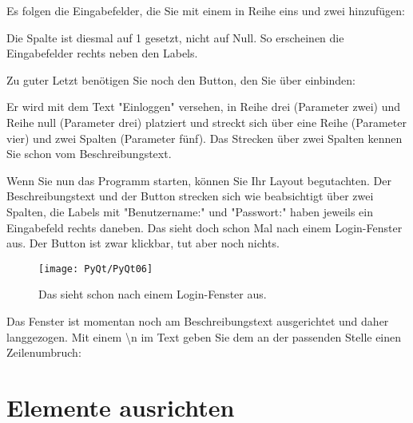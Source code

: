 Es folgen die Eingabefelder, die Sie mit einem  in Reihe eins und zwei hinzufügen:
    
\medskip



\medskip

Die Spalte ist diesmal auf 1 gesetzt, nicht auf Null. So erscheinen die Eingabefelder rechts neben den Labels.
    
Zu guter Letzt benötigen Sie noch den Button, den Sie über  einbinden:
    
\medskip


\medskip


Er wird mit dem Text "Einloggen"{} versehen, in Reihe drei (Parameter zwei) und Reihe null (Parameter drei) platziert und streckt sich über eine Reihe (Parameter vier) und zwei Spalten (Parameter fünf). Das Strecken über zwei Spalten kennen Sie schon vom Beschreibungstext.
    
Wenn Sie nun das Programm starten, können Sie Ihr Layout begutachten. Der Beschreibungstext und der Button strecken sich wie beabsichtigt über zwei Spalten, die Labels mit "Benutzername:"{} und "Passwort:"{} haben jeweils ein Eingabefeld rechts daneben. Das sieht doch schon Mal nach einem Login-Fenster aus. Der Button ist zwar klickbar, tut aber noch nichts.
    
 
\begin{figure}
  \texttt{[image: PyQt/PyQt06]}    
  \caption{Das sieht schon nach einem Login-Fenster aus.}\label{PyQt06}
\end{figure}     
    
   

Das Fenster ist momentan noch am Beschreibungstext ausgerichtet und daher langgezogen. Mit einem \textbackslash n im Text geben Sie dem  an der passenden Stelle einen Zeilenumbruch:
    
\medskip



\section{Elemente ausrichten}

